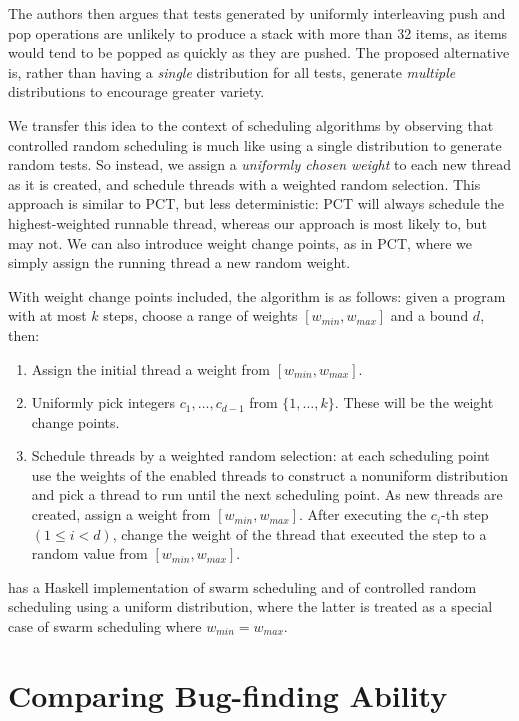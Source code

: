 The authors then argues that tests generated by uniformly interleaving
push and pop operations are unlikely to produce a stack with more than
32 items, as items would tend to be popped as quickly as they are
pushed.  The proposed alternative is, rather than having a
\emph{single} distribution for all tests, generate \emph{multiple}
distributions to encourage greater variety.

We transfer this idea to the context of scheduling algorithms by
observing that controlled random scheduling is much like using a
single distribution to generate random tests.  So instead, we assign a
\emph{uniformly chosen weight} to each new thread as it is created,
and schedule threads with a weighted random selection.  This approach
is similar to PCT, but less deterministic: PCT will always schedule
the highest-weighted runnable thread, whereas our approach is most
likely to, but may not.  We can also introduce weight change points,
as in PCT, where we simply assign the running thread a new random
weight.

With weight change points included, the algorithm is as follows: given a program
with at most $k$ steps, choose a range of weights $[w_{min}, w_{max}]$ and
a bound $d$, then:

\begin{enumerate}
\item Assign the initial thread a weight from $[w_{min}, w_{max}]$.
\item Uniformly pick integers $c_1, \ldots, c_{d-1}$ from $\{1, \ldots, k\}$.
These will be the weight change points.
\item Schedule threads by a weighted random selection: at each scheduling point
use the weights of the enabled threads to construct a nonuniform distribution
and pick a thread to run until the next scheduling point.  As new threads are
created, assign a weight from $[w_{min}, w_{max}]$.  After executing
the $c_i$-th step $(1 \leq i < d)$, change the weight of the thread that
executed the step to a random value from $[w_{min}, w_{max}]$.
\end{enumerate}

\dejafu{} has a Haskell implementation of swarm scheduling and of
controlled random scheduling using a uniform distribution, where the
latter is treated as a special case of swarm scheduling where
$w_{min} = w_{max}$.

\section{Comparing Bug-finding Ability}
\label{sec:algorithms-bench}

